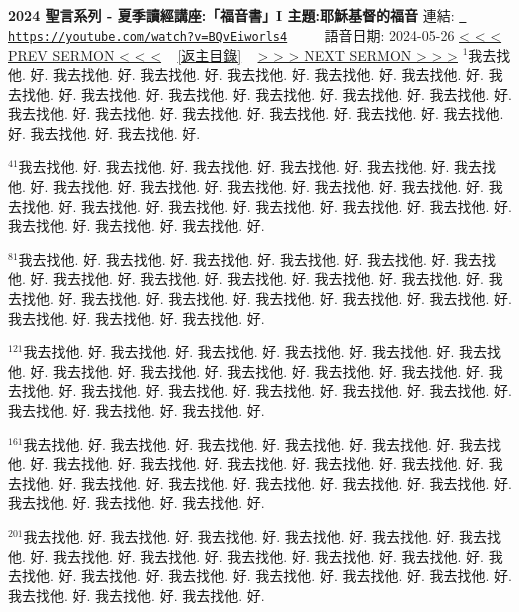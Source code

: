 \documentclass{book}
\begin{document}
\section{}
\label{sec:BQvEiworls4}
\textbf{2024 聖言系列 - 夏季讀經講座:「福音書」I 主題:耶穌基督的福音}
\newline
\newline
連結: \href{https://youtube.com/watch?v=BQvEiworls4}{\texttt{ https://youtube.com/watch?v=BQvEiworls4}} ~~~~ 語音日期: 2024-05-26 
\newline
\newline
\hyperref[sec:iBfE9eVripQ]{\small{< < < PREV SERMON < < <}}
~
\hyperref[sec:index]{\small{[返主目錄]}}
~
\hyperref[sec:5AhQhWw7knY]{\small{> > > NEXT SERMON > > >}}
\newline
\newline
$^{1}$我去找他.
好.
我去找他.
好.
我去找他.
好.
我去找他.
好.
我去找他.
好.
我去找他.
好.
我去找他.
好.
我去找他.
好.
我去找他.
好.
我去找他.
好.
我去找他.
好.
我去找他.
好.
我去找他.
好.
我去找他.
好.
我去找他.
好.
我去找他.
好.
我去找他.
好.
我去找他.
好.
我去找他.
好.
我去找他.
好.

$^{41}$我去找他.
好.
我去找他.
好.
我去找他.
好.
我去找他.
好.
我去找他.
好.
我去找他.
好.
我去找他.
好.
我去找他.
好.
我去找他.
好.
我去找他.
好.
我去找他.
好.
我去找他.
好.
我去找他.
好.
我去找他.
好.
我去找他.
好.
我去找他.
好.
我去找他.
好.
我去找他.
好.
我去找他.
好.
我去找他.
好.

$^{81}$我去找他.
好.
我去找他.
好.
我去找他.
好.
我去找他.
好.
我去找他.
好.
我去找他.
好.
我去找他.
好.
我去找他.
好.
我去找他.
好.
我去找他.
好.
我去找他.
好.
我去找他.
好.
我去找他.
好.
我去找他.
好.
我去找他.
好.
我去找他.
好.
我去找他.
好.
我去找他.
好.
我去找他.
好.
我去找他.
好.

$^{121}$我去找他.
好.
我去找他.
好.
我去找他.
好.
我去找他.
好.
我去找他.
好.
我去找他.
好.
我去找他.
好.
我去找他.
好.
我去找他.
好.
我去找他.
好.
我去找他.
好.
我去找他.
好.
我去找他.
好.
我去找他.
好.
我去找他.
好.
我去找他.
好.
我去找他.
好.
我去找他.
好.
我去找他.
好.
我去找他.
好.

$^{161}$我去找他.
好.
我去找他.
好.
我去找他.
好.
我去找他.
好.
我去找他.
好.
我去找他.
好.
我去找他.
好.
我去找他.
好.
我去找他.
好.
我去找他.
好.
我去找他.
好.
我去找他.
好.
我去找他.
好.
我去找他.
好.
我去找他.
好.
我去找他.
好.
我去找他.
好.
我去找他.
好.
我去找他.
好.
我去找他.
好.

$^{201}$我去找他.
好.
我去找他.
好.
我去找他.
好.
我去找他.
好.
我去找他.
好.
我去找他.
好.
我去找他.
好.
我去找他.
好.
我去找他.
好.
我去找他.
好.
我去找他.
好.
我去找他.
好.
我去找他.
好.
我去找他.
好.
我去找他.
好.
我去找他.
好.
我去找他.
好.
我去找他.
好.
我去找他.
好.
我去找他.
好.
\end{document}
